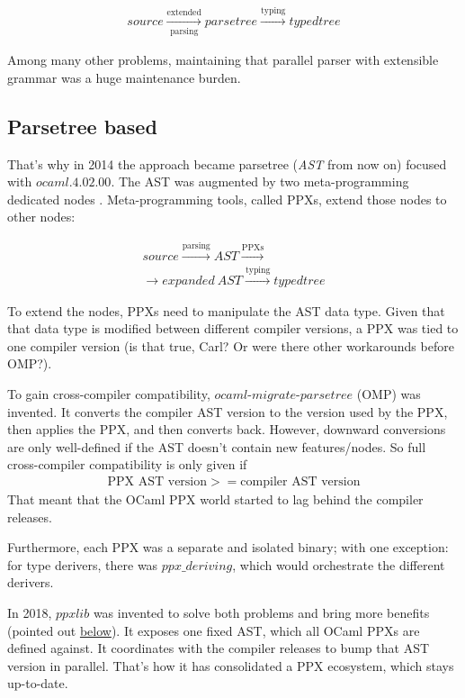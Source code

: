 \documentclass[10pt, a4paper, twocolumn]{article}
\begin{document}
\begin{align*}
source \xrightarrow[\text{parsing}]{\text{extended}} parsetree \xrightarrow{\text{typing}} typedtree
\end{align*}

Among many other problems, maintaining that parallel parser with extensible grammar was a huge maintenance burden.


\subsection{Parsetree based}

That's why in 2014 the approach became parsetree (\emph{AST} from now on) focused with $ocaml.4.02.00$. The AST was augmented by two meta-programming dedicated nodes \cite{extension_nodes}\cite{attributes}. Meta-programming tools, called PPXs, extend those nodes to other nodes:

\begin{gather*}
source \xrightarrow{\text{parsing}} AST \xrightarrow{\text{PPXs}}\\
\rightarrow expanded\ AST\xrightarrow{\text{typing}} typedtree
\end{gather*}

To extend the nodes, PPXs need to manipulate the AST data type. Given that that data type is modified between different compiler versions, a PPX was tied to one compiler version (is that true, Carl? Or were there other workarounds before OMP?).

To gain cross-compiler compatibility, $ocaml\mbox{-}migrate\mbox{-}parsetree$ (OMP)\cite{omp} was invented. It converts the compiler AST version to the version used by the PPX, then applies the PPX, and then converts back. However, downward conversions are only well-defined if the AST doesn't contain new features/nodes. So full cross-compiler compatibility is only given if
\begin{align*}
\text{PPX\ AST\ version} >= \text{compiler\ AST\ version}
\end{align*}
That meant that the OCaml PPX world started to lag behind the compiler releases.

Furthermore, each PPX was a separate and isolated binary; with one exception: for type derivers, there was $ppx \_ deriving$, which would orchestrate the different derivers.

In 2018, $ppxlib$\cite{ppxlib} was invented to solve both problems and bring more benefits (pointed out \hyperref[benefits]{below}). It exposes one fixed AST, which all OCaml PPXs are defined against. It coordinates with the compiler releases to bump that AST version in parallel. That's how it has consolidated a PPX ecosystem, which stays up-to-date.
\end{document}
